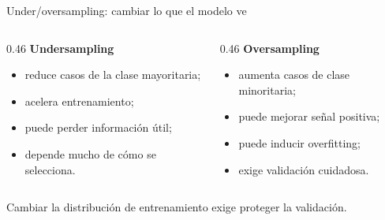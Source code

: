 \documentclass[aspectratio=169,12pt]{beamer}
\newcommand{\colhead}[1]{\textbf{#1}\par\vspace{2pt}}
\begin{document}
\begin{frame}{Under/oversampling: cambiar lo que el modelo ve}
  \begin{columns}[T]
    \begin{column}{0.46\textwidth}
      \colhead{Undersampling}
      \begin{itemize}
        \item reduce casos de la clase mayoritaria;
        \item acelera entrenamiento;
        \item puede perder información útil;
        \item depende mucho de cómo se selecciona.
      \end{itemize}
    \end{column}
    \begin{column}{0.46\textwidth}
      \colhead{Oversampling}
      \begin{itemize}
        \item aumenta casos de clase minoritaria;
        \item puede mejorar señal positiva;
        \item puede inducir overfitting;
        \item exige validación cuidadosa.
      \end{itemize}
    \end{column}
  \end{columns}
  \vspace{8pt}
  \begin{center}
    Cambiar la distribución de entrenamiento exige proteger la validación.
  \end{center}
\end{frame}
\end{document}
